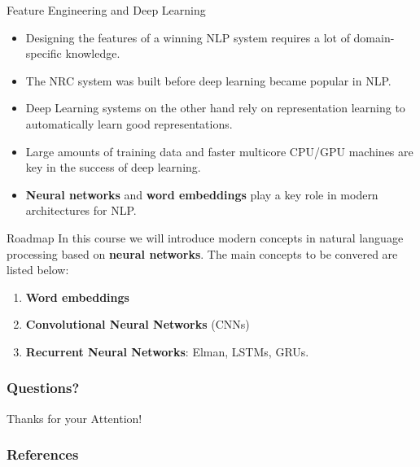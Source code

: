 \documentclass[handout]{beamer}
\begin{document}
\begin{frame}{Feature Engineering and Deep Learning}
\begin{scriptsize}
\begin{itemize}
\item Designing the features of a winning NLP system requires a lot of domain-specific knowledge.
\item The NRC system was built before deep learning became popular in NLP.
\item Deep Learning systems on the other hand rely on representation learning to automatically learn good representations.
\item Large amounts of training data and faster multicore CPU/GPU machines are key in the success of deep learning. 
\item \textbf{Neural networks} and \textbf{word embeddings} play a key role in modern  architectures for NLP.
\end{itemize}
\end{scriptsize}
\end{frame}




\begin{frame}{Roadmap}
In this course we will introduce modern concepts in natural language processing based on \textbf{neural networks}. The main concepts to be convered are listed below:
\begin{scriptsize}
\begin{enumerate}
\item  \textbf{Word embeddings}
\item  \textbf{Convolutional Neural Networks} (CNNs) 
\item \textbf{Recurrent Neural Networks}: Elman, LSTMs, GRUs. 
\end{enumerate} 
\end{scriptsize}
\end{frame}






\begin{frame}
\frametitle{Questions?}
\begin{center}\LARGE Thanks for your Attention!\\ \end{center}



\end{frame}

\begin{frame}[allowframebreaks]\scriptsize
\frametitle{References}


%
\end{frame}  


\end{document}
